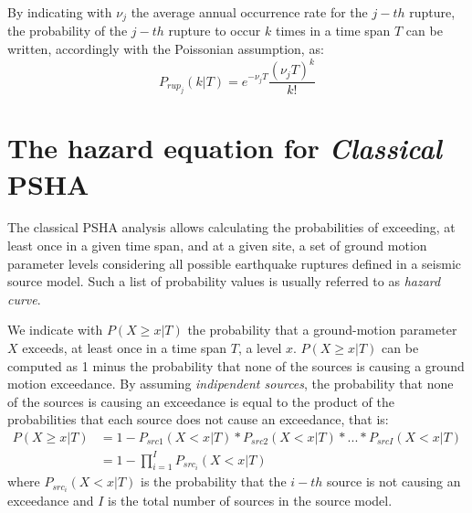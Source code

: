 By indicating with $\nu_{j}$ the average annual occurrence rate for the $j-th$ rupture, the probability of the
$j-th$ rupture to occur $k$ times in a time span $T$ can be written, accordingly with the Poissonian assumption,
as:
\begin{equation}
\label{eq:poisson_pd}
P_{rup_{j}}(k | T) = e^{-\nu_{j} T} \frac{(\nu_{j} T) ^ {k}}{k!}
\end{equation}

\section{The hazard equation for \textit{Classical} PSHA}
The classical PSHA analysis allows calculating the probabilities of exceeding, at least once in a given time
span, and at a given site, a set of ground motion parameter levels considering all possible earthquake ruptures
defined in a seismic source model. Such a list of probability values is usually referred to as \textit{hazard curve}.

We indicate with $P(X \ge x | T)$ the probability that a ground-motion parameter $X$ exceeds, at least once in
a time span $T$, a level $x$. $P(X \ge x | T)$ can be computed as 1 minus the probability that none of the
sources is causing a ground motion exceedance. By assuming \textit{indipendent sources}, the probability
that none of the sources is causing an exceedance is equal to the product of the probabilities that each source
does not cause an exceedance, that is:
\begin{align}
\label{eq:hazard_eq}
P(X \ge x | T) & =  1 - P_{src1}(X < x | T) * P_{src2}(X < x | T) * ... * P_{srcI}(X < x | T) \nonumber \\
		      & =  1 - \prod_{i=1}^{I} P_{src_{i}}(X < x | T)
\end{align}
where $P_{src_{i}}(X < x | T)$ is the probability that the $i-th$ source is not causing an exceedance and $I$ is the
total number of sources in the source model.

